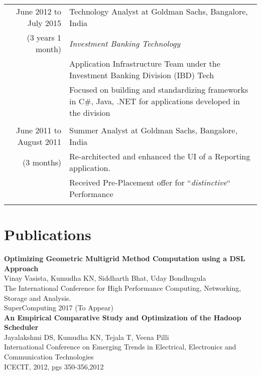 \documentclass[a4paper,10pt]{article} %
\begin{document}
\begin{tabular}{r|p{12cm}}
June 2012 to July 2015 & Technology Analyst at Goldman Sachs, Bangalore, India \\
{(3 years 1 month)}& \emph{Investment Banking Technology}\\ 
& \small {Application Infrastructure Team under the Investment Banking Division (IBD) Tech} \\
& \small {Focused on building and standardizing frameworks in C\#, Java, .NET for
applications developed in the division}\\
& \\

June 2011 to August 2011 & Summer Analyst at Goldman Sachs, Bangalore, India \\
{(3 months)}& \small{Re-architected and enhanced the UI of a Reporting application.}\\
& \small{ Received Pre-Placement offer for ``\emph{distinctive}`` Performance }\\
& \\

\end{tabular}


\section{Publications}
\textbf{Optimizing Geometric Multigrid Method Computation using a DSL Approach}\\
\small{Vinay Vasista, Kumudha KN, Siddharth Bhat, Uday Bondhugula} \\
\small{The International Conference for High Performance Computing, Networking, Storage and Analysis. \\ SuperComputing 2017 (To Appear)} \\


\textbf{An Empirical Comparative Study and Optimization of the Hadoop Scheduler} \\
\small{Jayalakshmi DS, Kumudha KN, Tejala T, Veena Pilli}\\
\small{International Conference on Emerging Trends in Electrical, Electronics and 
Communication Technologies \\ ICECIT, 2012, pgs 350-356,2012}
\\
\newpage
\end{document}
